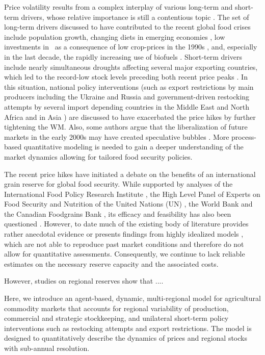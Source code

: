 \documentclass[12pt]{article}
\begin{document}
Price volatility results from a complex interplay of various long-term and short-term drivers, whose relative importance is still a contentious topic \cite{TAD14}. The set of long-term drivers discussed to have contributed to the recent global food crises include population growth, changing diets in emerging economies \cite{HEA10}, low investments in \RD~as a consequence of low crop-prices in the 1990s \cite{BRA08}, and, especially in the last decade, the rapidly increasing use of biofuels \cite{GOR13,FRA15}. Short-term drivers include nearly simultaneous droughts affecting several major exporting countries, which led to the record-low stock levels preceding both recent price peaks \cite{TRO11}. In this situation, national policy interventions (such as export restrictions by main producers including the Ukraine and Russia \cite{SHA11} and government-driven restocking attempts by several import depending countries in the Middle East and North Africa and in Asia \cite{TRO11,SCH17}) are discussed to have exacerbated the price hikes by further tightening the WM. Also, some authors argue that the liberalization of future markets in the early 2000s may have created speculative bubbles \cite{TAD14,LAG15}. More process-based quantitative modeling is needed to gain a deeper understanding of the market dynamics \cite{SCH17} allowing for tailored food security policies. 

The recent price hikes have initiated a debate on the benefits of an international grain reserve for global food security. While supported by analyses of the International Food Policy Research Institute \cite{BRA09a}, the High Level Panel of Experts on Food Security and Nutrition of the United Nations (UN) \cite{HLPE11}, the World Bank \cite{LIN08} and the Canadian Foodgrains Bank \cite{MCC11}, its efficacy and feasibility has also been questioned \cite{WRI12}. However, to date much of the existing body of literature provides rather anecdotal evidence \cite{BRA08} or presents findings from highly idealized models \cite{WIL91}, which are not able to reproduce past market conditions and therefore do not allow for quantitative assessments. Consequently, we continue to lack reliable estimates on the necessary reserve capacity and the associated costs.

However, studies on regional reserves show that ....

Here, we introduce an agent-based, dynamic, multi-regional model for agricultural commodity markets that accounts for regional variability of production, commercial and strategic stockkeeping, and unilateral short-term policy interventions such as restocking attempts and export restrictions. The model is designed to quantitatively describe the dynamics of prices and regional stocks with sub-annual resolution.
\end{document}
